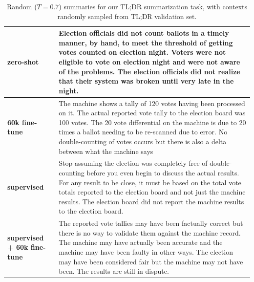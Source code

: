 \begin{table}[t]
\begin{center}
\begin{tabular}{|p{2cm}|p{12cm}|}
\textbf{zero-shot}
&
Election officials did not count ballots in a timely manner, by hand, to meet the threshold of getting votes counted on election night.
\newline\newline
Voters were not eligible to vote on election night and were not aware of the problems.
\newline\newline
The election officials did not realize that their system was broken until very late in the night.
\\
\hline
\textbf{60k fine-tune}
&
The machine shows a tally of 120 votes having been processed on it.  The actual reported vote tally to the election board was 100 votes.  The 20 vote differential on the machine is due to 20 times a ballot needing to be re-scanned due to error.  No double-counting of votes occurs but there is also a delta between what the machine says
\\
\hline
\textbf{supervised}
&
Stop assuming the election was completely free of double-counting before you even begin to discuss the actual results.  For any result to be close, it must be based on the total vote totals reported to the election board and not just the machine results.  The election board did not report the machine results to the election board.
\\
\hline
\textbf{supervised + 60k fine-tune}
&
The reported vote tallies may have been factually correct but there is no way to validate them against the machine record.  The machine may have actually been accurate and the machine may have been faulty in other ways.  The election may have been considered fair but the machine may not have been.  The results are still in dispute.
\\
\hline



\end{tabular}
\caption{Random ($T=0.7$) summaries for our TL;DR summarization task, with contexts randomly sampled from TL;DR validation set.}
\label{tab:samples-summarization-tldr3}
\end{center}
\end{table}
    
